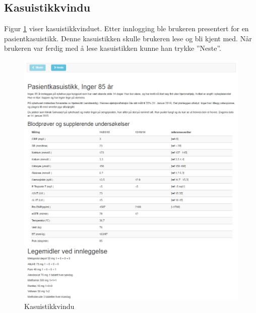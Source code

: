 \subsection{Kasuistikkvindu}
Figur \ref{fig:demo2} viser kasuistikkvinduet. Etter innlogging ble brukeren presentert for en pasientkasuistikk. Denne kasuistikken skulle brukeren lese og bli kjent med. Når brukeren var ferdig med å lese kasuistikken kunne han trykke ''Neste''.
\begin{figure}[H]
\begin{center}
\includegraphics[width=14cm]{images/demoimages/2}
\caption{Kasuistikkvindu}
\label{fig:demo2}
\end{center}
\end{figure}

\newpage
